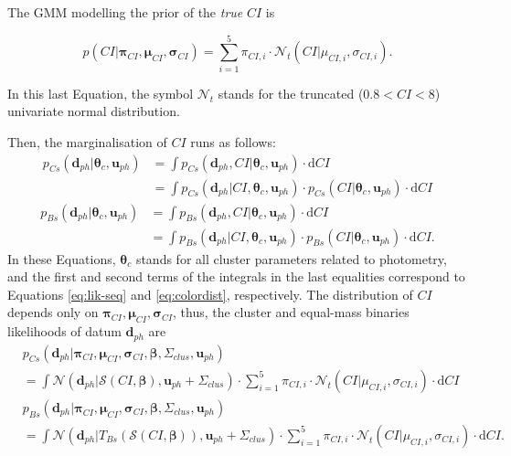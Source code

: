  The GMM modelling the prior of the \emph{true} $CI$ is 

\begin{equation}
\label{eq:colordist}
p(CI|\boldsymbol{\pi}_{CI},\boldsymbol{\mu}_{CI},\boldsymbol{\sigma}_{CI})= \sum_{i=1}^5 \pi_{CI,i} \cdot \mathcal{N}_t(CI| \mu_{CI,i},\sigma_{CI,i}).
\end{equation}

In this last Equation, the symbol $\mathcal{N}_t$ stands for the truncated ($0.8<CI<8$) univariate normal distribution.

Then, the marginalisation of $CI$ runs as follows:
\begin{align}
\label{eq:clmarginalps}
 p_{Cs}(\mathbf{d}_{ph}| \boldsymbol{\theta}_c,\mathbf{u}_{ph})&=\int p_{Cs}(\mathbf{d}_{ph},CI| \boldsymbol{\theta}_c,\mathbf{u}_{ph}) \cdot \mathrm{d}CI \nonumber \\
 &=\int p_{Cs}(\mathbf{d}_{ph}|CI, \boldsymbol{\theta}_c,\mathbf{u}_{ph}) \cdot p_{Cs}(CI| \boldsymbol{\theta}_c,\mathbf{u}_{ph})\cdot \mathrm{d}CI 
\end{align}
\begin{align}
\label{eq:clmarginalpb}
p_{Bs}(\mathbf{d}_{ph}| \boldsymbol{\theta}_c,\mathbf{u}_{ph})&=\int p_{Bs}(\mathbf{d}_{ph},CI| \boldsymbol{\theta}_c,\mathbf{u}_{ph})\cdot \mathrm{d}CI \nonumber \\
 &=\int p_{Bs}(\mathbf{d}_{ph}|CI, \boldsymbol{\theta}_c,\mathbf{u}_{ph})\cdot p_{Bs}(CI| \boldsymbol{\theta}_c,\mathbf{u}_{ph})\cdot \mathrm{d}CI.
\end{align}
In these Equations, $\boldsymbol{\theta}_c$ stands for all cluster parameters related to photometry, and the first and second terms of the integrals in the last equalities correspond to Equations \ref{eq:lik-seq} and \ref{eq:colordist}, respectively. The distribution of $CI$ depends only on $\boldsymbol{\pi}_{CI},\boldsymbol{\mu}_{CI},\boldsymbol{\sigma}_{CI}$, thus, the cluster and equal-mass binaries likelihoods of datum $\mathbf{d}_{ph}$ are 
\begin{align}
\label{eq:lik-seq2}
 &p_{Cs}(\mathbf{d}_{ph}|\boldsymbol{\pi}_{CI},\boldsymbol{\mu}_{CI},\boldsymbol{\sigma}_{CI},\boldsymbol{\beta},\Sigma_{clus},\mathbf{u}_{ph}) \nonumber \\
 &=\int{\mathcal{N}}(\mathbf{d}_{ph}|\boldsymbol{\mathcal{S}}(CI, \boldsymbol{\beta}), \mathbf{u}_{ph}+\Sigma_{clus})\cdot \sum_{i=1}^5 \pi_{CI,i}\cdot \mathcal{N}_t(CI| \mu_{CI,i},\sigma_{CI,i}) \cdot \mathrm{d}CI\nonumber \\
&p_{Bs}(\mathbf{d}_{ph}|\boldsymbol{\pi}_{CI},\boldsymbol{\mu}_{CI},\boldsymbol{\sigma}_{CI}, \boldsymbol{\beta},\Sigma_{clus}, \mathbf{u}_{ph})\nonumber \\
&=\int{\mathcal{N}}(\mathbf{d}_{ph}|T_{Bs}( \boldsymbol{\mathcal{S}}(CI, \boldsymbol{\beta})), \mathbf{u}_{ph}+\Sigma_{clus}) \cdot \sum_{i=1}^5 \pi_{CI,i}\cdot \mathcal{N}_t(CI| \mu_{CI,i},\sigma_{CI,i}) \cdot \mathrm{d}CI.
\end{align}


